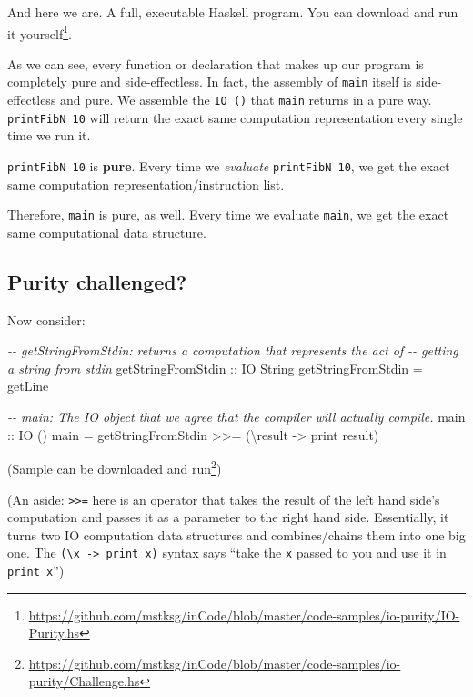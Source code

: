 \documentclass[]{article}
\newenvironment{Shaded}{}{}
\newcommand{\CommentTok}[1]{\textcolor[rgb]{0.38,0.63,0.69}{\textit{#1}}}
\newcommand{\DataTypeTok}[1]{\textcolor[rgb]{0.56,0.13,0.00}{#1}}
\newcommand{\FunctionTok}[1]{\textcolor[rgb]{0.02,0.16,0.49}{#1}}
\newcommand{\NormalTok}[1]{#1}
\newcommand{\OperatorTok}[1]{\textcolor[rgb]{0.40,0.40,0.40}{#1}}
\newcommand{\OtherTok}[1]{\textcolor[rgb]{0.00,0.44,0.13}{#1}}
\renewcommand{\href}[2]{#2\footnote{\url{#1}}}
\begin{document}
And here we are. A full, executable Haskell program. You can
\href{https://github.com/mstksg/inCode/blob/master/code-samples/io-purity/IO-Purity.hs}{download
and run it yourself}.

As we can see, every function or declaration that makes up our program is
completely pure and side-effectless. In fact, the assembly of \texttt{main}
itself is side-effectless and pure. We assemble the \texttt{IO\ ()} that
\texttt{main} returns in a pure way. \texttt{printFibN\ 10} will return the
exact same computation representation every single time we run it.

\texttt{printFibN\ 10} is \textbf{pure}. Every time we \emph{evaluate}
\texttt{printFibN\ 10}, we get the exact same computation
representation/instruction list.

Therefore, \texttt{main} is pure, as well. Every time we evaluate \texttt{main},
we get the exact same computational data structure.

\subsection{Purity challenged?}\label{purity-challenged}

Now consider:

\begin{Shaded}
\begin{Highlighting}[]
\CommentTok{{-}{-}  getStringFromStdin: returns a computation that represents the act of}
\CommentTok{{-}{-}      getting a string from stdin}
\OtherTok{getStringFromStdin ::} \DataTypeTok{IO} \DataTypeTok{String}
\NormalTok{getStringFromStdin }\OtherTok{=} \FunctionTok{getLine}

\CommentTok{{-}{-}  main: The IO object that we agree that the compiler will actually compile.}
\OtherTok{main ::} \DataTypeTok{IO}\NormalTok{ ()}
\NormalTok{main }\OtherTok{=}\NormalTok{ getStringFromStdin }\OperatorTok{\textgreater{}\textgreater{}=}\NormalTok{ (\textbackslash{}result }\OtherTok{{-}\textgreater{}} \FunctionTok{print}\NormalTok{ result)}
\end{Highlighting}
\end{Shaded}

(Sample can be
\href{https://github.com/mstksg/inCode/blob/master/code-samples/io-purity/Challenge.hs}{downloaded
and run})

(An aside: \texttt{\textgreater{}\textgreater{}=} here is an operator that takes
the result of the left hand side's computation and passes it as a parameter to
the right hand side. Essentially, it turns two IO computation data structures
and combines/chains them into one big one. The
\texttt{(\textbackslash{}x\ -\textgreater{}\ print\ x)} syntax says ``take the
\texttt{x} passed to you and use it in \texttt{print\ x}'')
\end{document}

